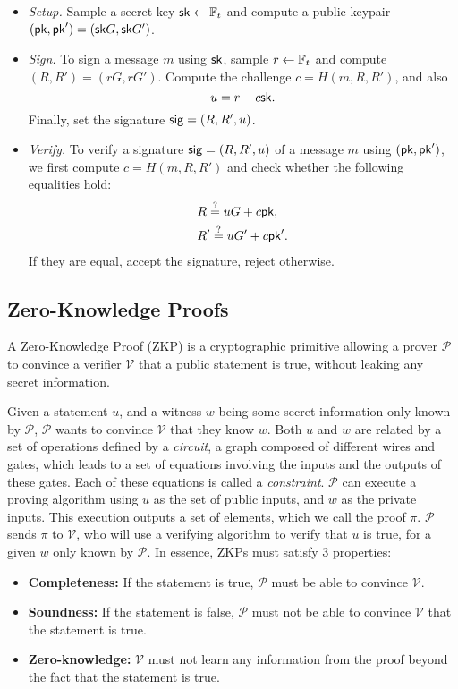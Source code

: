 \begin{itemize}
    \item \emph{Setup.} Sample a secret key $\mathsf{sk} \gets \mathbb{F}_t$ and compute a public keypair $(\mathsf{pk}, \mathsf{pk}') = (\mathsf{sk} G, \mathsf{sk} G')$. 
    \item \emph{Sign.} To sign a message $m$ using $\mathsf{sk}$, sample $r \gets \mathbb{F}_t$ and compute $(R, R') = (rG, rG')$. Compute the challenge $c = H(m, R, R')$, and also 
    \[u = r - c \mathsf{sk}.\]
    Finally, set the signature $\mathsf{sig} = (R, R', u)$. 
    \item \emph{Verify.} To verify a signature $\mathsf{sig} = (R, R', u)$ of a message $m$ using $(\mathsf{pk}, \mathsf{pk}')$, we first compute $c = H(m, R, R')$ and check whether the following equalities hold:
    \[\begin{aligned}
        & R \stackrel{?}{=} uG + c \mathsf{pk}, \\
        & R' \stackrel{?}{=} uG' + c \mathsf{pk}'. \\
    \end{aligned}\]
    If they are equal, accept the signature, reject otherwise.
\end{itemize}

\subsection{Zero-Knowledge Proofs}
\label{subsec:zkp}

A Zero-Knowledge Proof (ZKP) \cite{gmr85} is a cryptographic primitive allowing a prover $\mathcal{P}$ to convince a verifier $\mathcal{V}$ that a public statement is true, without leaking any secret information. 

Given a statement $u$, and a witness $w$ being some secret information only known by $\mathcal{P}$, $\mathcal{P}$ wants to convince $\mathcal{V}$ that they know $w$. Both $u$ and $w$ are related by a set of operations defined by a \textit{circuit}, a graph composed of different wires and gates, which leads to a set of equations involving the inputs and the outputs of these gates. Each of these equations is called a \textit{constraint}. $\mathcal{P}$ can execute a proving algorithm using $u$ as the set of public inputs, and $w$ as the private inputs. This execution outputs a set of elements, which we call the proof $\pi$. $\mathcal{P}$ sends $\pi$ to $\mathcal{V}$, who will use a verifying algorithm to verify that $u$ is true, for a given $w$ only known by $\mathcal{P}$. In essence, ZKPs must satisfy 3 properties:

\begin{itemize}
 \item \textbf{Completeness:} If the statement is true, $\mathcal{P}$ must be able to convince $\mathcal{V}$.
 \item \textbf{Soundness:} If the statement is false, $\mathcal{P}$ must not be able to convince $\mathcal{V}$ that the statement is true.
 \item \textbf{Zero-knowledge:} $\mathcal{V}$ must not learn any information from the proof beyond the fact that the statement is true.
\end{itemize}

